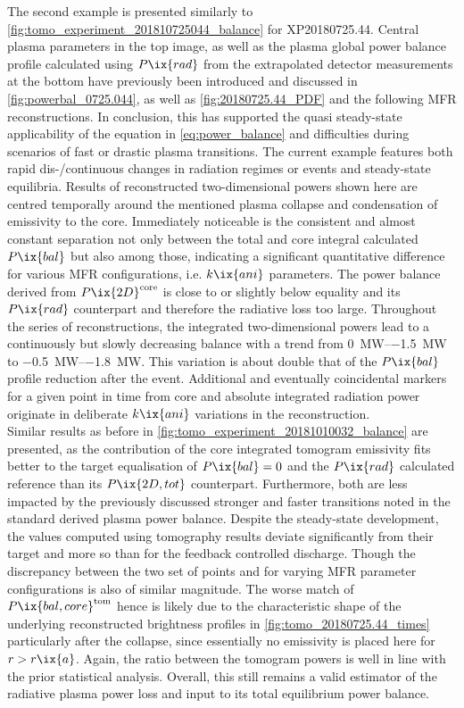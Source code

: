                     The second example is presented similarly to \cref{fig:tomo_experiment_201810725044_balance} for XP20180725.44. Central plasma parameters in the top image, as well as the plasma global power balance profile calculated using $P\ix{rad}$ from the extrapolated detector measurements at the bottom have previously been introduced and discussed in \cref{fig:powerbal_0725.044}, as well as \cref{fig:20180725.44_PDF} and the following MFR reconstructions. In conclusion, this has supported the quasi steady-state applicability of the equation in \cref{eq:power_balance} and difficulties during scenarios of fast or drastic plasma transitions. The current example features both rapid dis-/continuous changes in radiation regimes or events and steady-state equilibria. Results of reconstructed two-dimensional powers shown here are centred temporally around the mentioned plasma collapse and condensation of emissivity to the core. Immediately noticeable is the consistent and almost constant separation not only between the total and core integral calculated $P\ix{bal}$ but also among those, indicating a significant quantitative difference for various MFR configurations, i.e. $k\ix{ani}$ parameters. The power balance derived from $P\ix{2D}^{\text{core}}$ is close to or slightly below equality and its $P\ix{rad}$ counterpart and therefore the radiative loss too large. Throughout the series of reconstructions, the integrated two-dimensional powers lead to a continuously but slowly decreasing balance with a trend from \SIrange{0}{-1.5}{\mega\watt} to \SIrange{-0.5}{-1.8}{\mega\watt}. This variation is about double that of the $P\ix{bal}$ profile reduction after the event. Additional and eventually coincidental markers for a given point in time from core and absolute integrated radiation power originate in deliberate $k\ix{ani}$ variations in the reconstruction.\\%
                    Similar results as before in \cref{fig:tomo_experiment_20181010032_balance} are presented, as the contribution of the core integrated tomogram emissivity fits better to the target equalisation of $P\ix{bal}=0$ and the $P\ix{rad}$ calculated reference than its $P\ix{2D,tot}$ counterpart. Furthermore, both are less impacted by the previously discussed stronger and faster transitions noted in the standard derived plasma power balance. Despite the steady-state development, the values computed using tomography results deviate significantly from their target and more so than for the feedback controlled discharge. Though the discrepancy between the two set of points and for varying MFR parameter configurations is also of similar magnitude. The worse match of $P\ix{bal,core}^{\text{tom}}$ hence is likely due to the characteristic shape of the underlying reconstructed brightness profiles in \cref{fig:tomo_20180725.44_times} particularly after the collapse, since essentially no emissivity is placed here for $r>r\ix{a}$. Again, the ratio between the tomogram powers is well in line with the prior statistical analysis. Overall, this still remains a valid estimator of the radiative plasma power loss and input to its total equilibrium power balance.\\%
%
